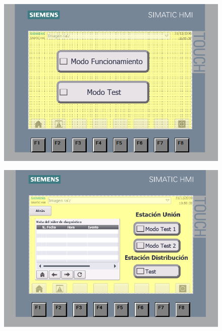 \begin{figure}[H]
  \centering

  \begin{minipage}{0.8\textwidth}
    \centering
    \includegraphics[width=\textwidth]{figs/HMI_inicio}
    \label{fig:HMI_inicio}
  \end{minipage}
  \hfill
  \begin{minipage}{0.8\textwidth}
    \centering
    \includegraphics[width=\textwidth]{figs/HMI_test_principal}
    \label{fig:HMI_test_principal}
  \end{minipage}

\end{figure}
\clearpage

